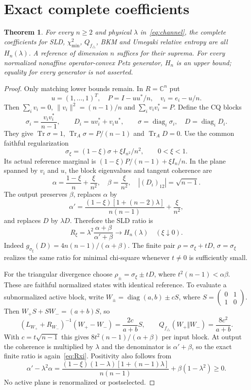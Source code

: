 \documentclass[11pt]{article}
\newtheorem{theorem}{Theorem}[section]
\theoremstyle{remark}\newtheorem{remark}[theorem]{Remark}
\newcommand{\Tr}{\operatorname{Tr}}
\newcommand{\diag}{\operatorname{diag}}
\begin{document}
\section{Exact complete coefficients}
\begin{theorem}\label{thm:exact}
For every $n\geq2$ and physical $\lambda$ in~\eqref{eq:channel}, the complete coefficients for SLD, $\chi_{\min}^2$, $Q_{f_\triangle}$, BKM and Umegaki relative entropy are all $H_n(\lambda)$. A reference of dimension $n$ suffices for their suprema. For every normalized nonaffine operator-convex Petz generator, $H_n$ is an upper bound; equality for every generator is not asserted.
\end{theorem}
\begin{proof}
Only matching lower bounds remain. In $R=\mathbb C^n$ put
\[
 u=(1,\ldots,1)^T,\quad P=I-uu^*/n,\quad v_i=e_i-u/n.
\]
Then $\sum_iv_i=0$, $\|v_i\|^2=(n-1)/n$ and $\sum_iv_iv_i^*=P$. Define the CQ blocks
\[
 \sigma_i=\frac{v_iv_i^*}{n-1},\qquad D_i=uv_i^*+v_iu^*,\qquad
 \sigma=\diag_i\sigma_i,\quad D=\diag_iD_i.
\]
They give $\Tr\sigma=1$, $\Tr_A\sigma=P/(n-1)$ and $\Tr_A D=0$. Use the common faithful regularization
\[
 \sigma_\xi=(1-\xi)\sigma+\xi I_{n^2}/n^2,
 \qquad 0<\xi<1.
\]
Its actual reference marginal is $(1-\xi)P/(n-1)+\xi I_n/n$. In the plane spanned by $v_i$ and $u$, the block eigenvalues and tangent coherence are
\[
 \alpha=\frac{1-\xi}{n}+\frac\xi{n^2},\quad
 \beta=\frac\xi{n^2},\quad |(D_i)_{12}|=\sqrt{n-1}.
\]
The output preserves $\beta$, replaces $\alpha$ by
\begin{equation}\label{eq:alphaout}
 \alpha'=\frac{(1-\xi)[1+(n-2)\lambda]}{n(n-1)}+\frac\xi{n^2},
\end{equation}
and replaces $D$ by $\lambda D$. Therefore the SLD ratio is
\begin{equation}\label{eq:Rxi}
 R_\xi=\lambda^2\frac{\alpha+\beta}{\alpha'+\beta}
 \longrightarrow H_n(\lambda)\quad(\xi\downarrow0).
\end{equation}
Indeed $g_{\sigma_\xi}(D)=4n(n-1)/(\alpha+\beta)$. The finite pair $\rho=\sigma_\xi+tD$, $\sigma=\sigma_\xi$ realizes the same ratio for minimal chi-square whenever $t\ne0$ is sufficiently small.

For the triangular divergence choose $\rho_\pm=\sigma_\xi\pm tD$, where $t^2(n-1)<\alpha\beta$. These are faithful normalized states with identical reference. To evaluate a subnormalized active block, write $W_\pm=\diag(a,b)\pm cS$, where $S=\left(\begin{smallmatrix}0&1\\1&0\end{smallmatrix}\right)$. Then $W_+S+SW_-=(a+b)S$, so
\[
 (L_{W_+}+R_{W_-})^{-1}(W_+-W_-)=\frac{2c}{a+b}S,
 \qquad Q_{f_\triangle}(W_+\Vert W_-)=\frac{8c^2}{a+b}.
\]
With $c=t\sqrt{n-1}$ this gives $8t^2(n-1)/(\alpha+\beta)$ per input block. At output the coherence is multiplied by $\lambda$ and the denominator is $\alpha'+\beta$, so the exact finite ratio is again~\eqref{eq:Rxi}. Positivity also follows from
\[
 \alpha'-\lambda^2\alpha=
 \frac{(1-\xi)(1-\lambda)[1+(n-1)\lambda]}{n(n-1)}
 +\beta(1-\lambda^2)\geq0.
\]
No active plane is renormalized or postselected.


\end{proof}
\end{document}
